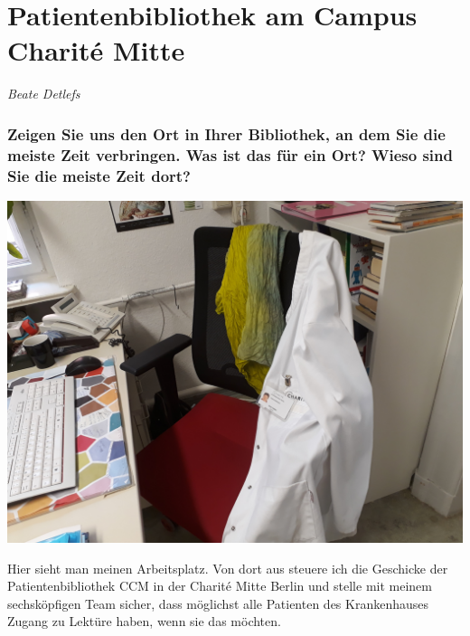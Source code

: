 
\vspace*{.5cm}
\section{Patientenbibliothek am Campus Charité Mitte}
\begin{center}
\emph{Beate Detlefs}
\end{center}
\vspace*{1cm}

\hypertarget{zeigen-sie-uns-den-ort-in-ihrer-bibliothek-an-dem-sie-die-meiste-zeit-verbringen.-was-ist-das-fuxfcr-ein-ort-wieso-sind-sie-die-meiste-zeit-dort}{%
\subsubsection*{Zeigen Sie uns den Ort in Ihrer Bibliothek, an dem Sie die
meiste Zeit verbringen. Was ist das für ein Ort? Wieso sind Sie die
meiste Zeit
dort?}\label{zeigen-sie-uns-den-ort-in-ihrer-bibliothek-an-dem-sie-die-meiste-zeit-verbringen.-was-ist-das-fuxfcr-ein-ort-wieso-sind-sie-die-meiste-zeit-dort}}

\begin{center}
\includegraphics{patientenbibliothek/img/Arbeitsplatz.jpg}
\end{center}

Hier sieht man meinen Arbeitsplatz. Von dort aus steuere ich die
Geschicke der Patientenbibliothek CCM in der Charité Mitte Berlin und
stelle mit meinem sechsköpfigen Team sicher, dass möglichst alle
Patienten des Krankenhauses Zugang zu Lektüre haben, wenn sie das
möchten.

